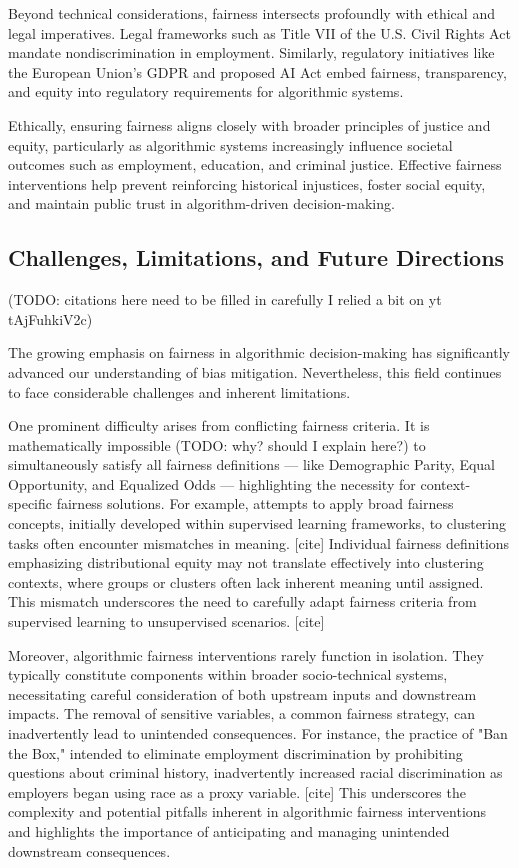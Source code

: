 Beyond technical considerations, fairness intersects profoundly with
ethical and legal imperatives. Legal frameworks such as Title VII of
the U.S. Civil Rights Act mandate nondiscrimination in employment.
Similarly, regulatory initiatives like the European Union’s GDPR and
proposed AI Act embed fairness, transparency, and equity into
regulatory requirements for algorithmic systems.

Ethically, ensuring fairness aligns closely with broader principles
of justice and equity, particularly as algorithmic systems
increasingly influence societal outcomes such as employment,
education, and criminal justice. Effective fairness interventions
help prevent reinforcing historical injustices, foster social equity,
and maintain public trust in algorithm-driven decision-making.

\subsection{Challenges, Limitations, and Future
Directions}\label{subsec:challenges_future}
(TODO: citations here need to be filled in carefully I relied a bit
on yt tAjFuhkiV2c)

The growing emphasis on fairness in algorithmic decision-making has
significantly advanced our understanding of bias mitigation.
Nevertheless, this field continues to face considerable challenges
and inherent limitations.

One prominent difficulty arises from conflicting fairness criteria.
It is mathematically impossible (TODO: why? should I explain here?)
to simultaneously satisfy all fairness definitions — like
Demographic Parity, Equal Opportunity,
and Equalized Odds — highlighting the necessity for context-specific
fairness solutions. For example, attempts to apply broad fairness
concepts, initially developed within supervised learning frameworks,
to clustering tasks often encounter mismatches in meaning. [cite] Individual
fairness definitions emphasizing distributional equity may not
translate effectively into clustering contexts, where groups or
clusters often lack inherent meaning until assigned. This mismatch
underscores the need to carefully adapt fairness criteria from
supervised learning to unsupervised scenarios. [cite]

Moreover, algorithmic fairness interventions rarely function in
isolation. They typically constitute components within broader
socio-technical systems, necessitating careful consideration of both
upstream inputs and downstream impacts. The removal of sensitive
variables, a common fairness strategy, can inadvertently lead to
unintended consequences. For instance, the practice of "Ban the Box,"
intended to eliminate employment discrimination by prohibiting
questions about criminal history, inadvertently increased racial
discrimination as employers began using race as a proxy variable. [cite]
This underscores the complexity and potential pitfalls inherent in
algorithmic fairness interventions and highlights the importance of
anticipating and managing unintended downstream consequences.

